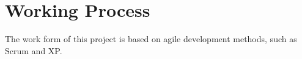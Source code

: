 \section{Working Process}
The work form of this project is based on agile development methods, such as Scrum and XP. 
